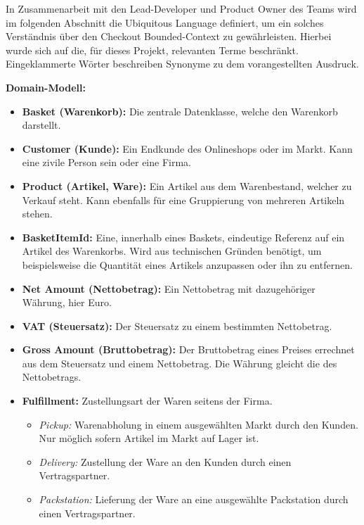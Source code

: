 In Zusammenarbeit mit den Lead-Developer und \Gls{Product Owner} des Teams wird im folgenden Abschnitt die Ubiquitous Language definiert, um ein solches Verständnis über den Checkout Bounded-Context zu gewährleisten. Hierbei wurde sich auf die, für dieses Projekt, relevanten Terme beschränkt. Eingeklammerte Wörter beschreiben Synonyme zu dem vorangestellten Ausdruck.

{\large \textbf{Domain-Modell:}}
\begin{itemize}[noitemsep,nolistsep]
	\item \textbf{Basket (Warenkorb): } {Die zentrale Datenklasse, welche den Warenkorb darstellt.}
	\item \textbf{Customer (Kunde): } {Ein Endkunde des Onlineshops oder im Markt. Kann eine zivile Person sein oder eine Firma.}
	\item \textbf{Product (Artikel, Ware): } {Ein Artikel aus dem Warenbestand, welcher zu Verkauf steht. Kann ebenfalls für eine Gruppierung von mehreren Artikeln stehen.}
	\item \textbf{BasketItemId: } {Eine, innerhalb eines Baskets, eindeutige Referenz auf ein Artikel des Warenkorbs. Wird aus technischen Gründen benötigt, um beispielsweise die Quantität eines Artikels anzupassen oder ihn zu entfernen.}
	\item \textbf{Net Amount (Nettobetrag): } {Ein Nettobetrag mit dazugehöriger Währung, hier Euro.} %
	\item \textbf{VAT (Steuersatz): } {Der Steuersatz zu einem bestimmten Nettobetrag.}
	\item \textbf{Gross Amount (Bruttobetrag): } {Der Bruttobetrag eines Preises errechnet aus dem Steuersatz und einem Nettobetrag. Die Währung gleicht die des Nettobetrags.}
	\item \textbf{Fulfillment: } {Zustellungsart der Waren seitens der Firma.}
	\begin{itemize}[noitemsep,nolistsep]
		\item \textit{Pickup: } {Warenabholung in einem ausgewählten Markt durch den Kunden. Nur möglich sofern Artikel im Markt auf Lager ist.}
		\item \textit{Delivery: } {Zustellung der Ware an den Kunden durch einen Vertragspartner.}
		\item \textit{Packstation: } {Lieferung der Ware an eine ausgewählte Packstation durch einen Vertragspartner.}
	\end{itemize}
\end{itemize}
\vspace{0.4em}

